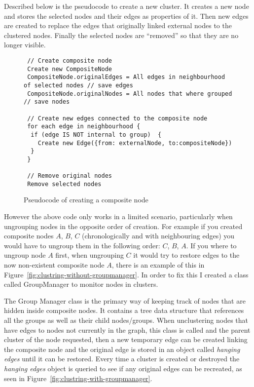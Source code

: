 Described below is the pseudocode to create a new cluster. It creates a new node and stores the selected nodes and their edges as properties of it. Then new edges are created to replace the edges that originally linked external nodes to the clustered nodes. Finally the selected nodes are ``removed'' so that they are no longer visible.

\begin{figure}[h]
  \centering
  \begin{lstlisting}
 // Create composite node 
 Create new CompositeNode 
 CompositeNode.originalEdges = All edges in neighbourhood of selected nodes // save edges
 CompositeNode.originalNodes = All nodes that where grouped // save nodes

 // Create new edges connected to the composite node
 for each edge in neighbourhood {
  if (edge IS NOT internal to group)  {
    Create new Edge({from: externalNode, to:compositeNode})
  }
 }

 // Remove original nodes
 Remove selected nodes
 \end{lstlisting}
 \caption{Pseudocode of creating a composite node}
\end{figure}

However the above code only works in a limited scenario, particularly when ungrouping nodes in the opposite order of creation. For example if you created composite nodes $A$, $B$, $C$ (chronologically and with neighbouring edges) you would have to ungroup them in the following order: $C$, $B$, $A$. If you where to ungroup node $A$ first, when ungrouping $C$ it would try to restore edges to the now non-existent composite node $A$, there is an example of this in Figure~\ref{fig:clustring-without-groupmanager}. In order to fix this I created a class called GroupManager to monitor nodes in clusters.

The Group Manager class is the primary way of keeping track of nodes that are hidden inside composite nodes. It contains a tree data structure that references all the groups as well as their child nodes/groups. When unclustering nodes that have edges to nodes not currently in the graph, this class is called and the parent cluster of the node requested, then a new temporary edge can be created linking the composite node and the original edge is stored in an object called \textit{hanging edges} until it can be restored. Every time a cluster is created or destroyed the \textit{hanging edges} object is queried to see if any original edges can be recreated, as seen in Figure~\ref{fig:clustring-with-groupmanager}.

